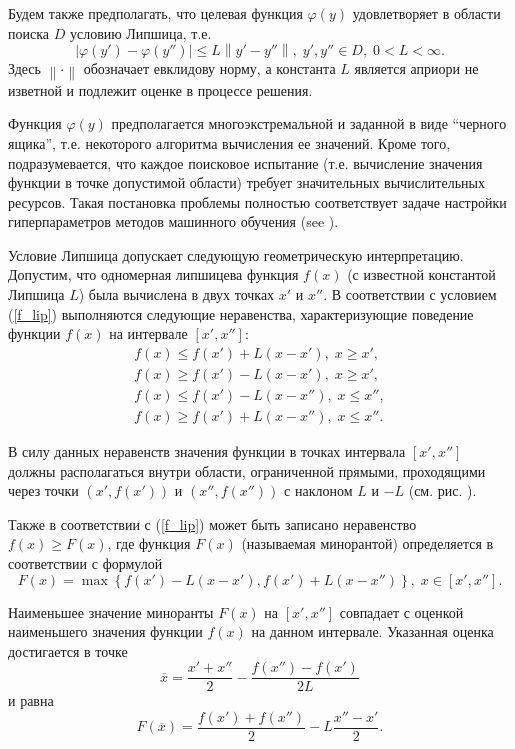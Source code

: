 \documentclass[preprint,12pt]{elsarticle}
\begin{document}
Будем также предполагать, что целевая функция $\varphi(y)$ удовлетворяет в области поиска $D$ условию Липшица, т.е.
\begin{equation} \label{f_lip}
	\left| \varphi(y')-\varphi(y'') \right| \leq L\left\| y' - y''  \right\| , \; y',y'' \in D, \; 0<L<\infty.
\end{equation}
Здесь $ \left\| \cdot \right\|$ обозначает евклидову норму, а константа $L$ является априори не изветной и подлежит оценке в процессе решения. 

Функция $\varphi(y)$ предполагается многоэкстремальной и заданной в виде ``черного ящика'', т.е. некоторого алгоритма вычисления ее значений. Кроме того, подразумевается, что каждое поисковое испытание (т.е. вычисление значения функции в точке допустимой области) требует значительных вычислительных ресурсов. Такая постановка проблемы полностью соответствует задаче настройки гиперпараметров методов машинного обучения (see ).

Условие Липшица допускает следующую геометрическую интерпретацию. Допустим, что одномерная липшицева функция $f(x)$ (с известной константой Липшица $L$) была вычислена в двух точках $x'$ и $x''$. В соответствии с условием (\ref{f_lip}) выполняются следующие неравенства, характеризующие поведение функции $f(x)$ на интервале $[x', x'']$:
\begin{gather*}
	f(x) \leq f(x') + L(x-x'), \; x \geq x',\\
	f(x) \geq f(x') - L(x-x'), \; x \geq x',\\
	f(x) \leq f(x') - L(x-x''), \; x \leq x'',\\
	f(x) \geq f(x') + L(x-x''), \; x \leq x''.
\end{gather*}

В силу данных неравенств значения функции в точках интервала $[x', x'']$ должны располагаться внутри области, ограниченной прямыми, проходящими через точки $(x', f(x'))$ и $(x'', f(x''))$ с наклоном $L$ и $-L$ (см. рис. ).

Также в соответствии с (\ref{f_lip}) может быть записано неравенство $f(x) \geq F(x)$, где функция $F(x)$ (называемая минорантой) определяется в соответствии с формулой
\[
F(x) = \max\left\{f(x') - L(x-x'),f(x') + L(x-x'')\right\}, \; x\in [x', x''].
\] 

Наименьшее значение миноранты $F(x)$ на $[x', x'']$ совпадает с оценкой наименьшего значения функции $f(x)$ на данном интервале. Указанная оценка достигается в точке 
\[
\overline{x} = \frac{x'+x''}{2}-\frac{f(x'')-f(x')}{2L}
\] 
и равна
\[
F(\overline{x}) = \frac{f(x')+f(x'')}{2} -L \frac{x''-x'}{2}.
\]
\end{document}
